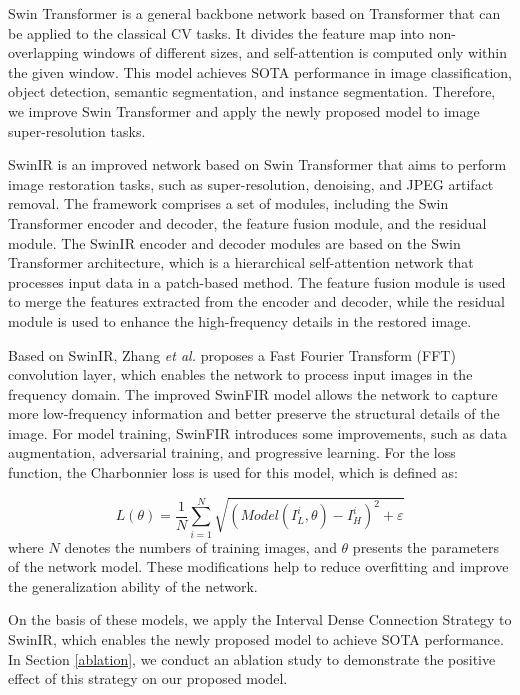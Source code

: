 \documentclass[default,iicol]{sn-jnl}
\theoremstyle{thmstyleone}\newtheorem{theorem}{Theorem}\newtheorem{proposition}[theorem]{Proposition}
\theoremstyle{thmstyletwo}\newtheorem{example}{Example}\newtheorem{remark}{Remark}\theoremstyle{thmstylethree}\newtheorem{definition}{Definition}
\begin{document}
Swin Transformer \cite{liu2021swin} is a general backbone network based on Transformer that can be applied to the classical CV tasks. It divides the feature map into non-overlapping windows of different sizes, and self-attention is computed only within the given window. This model achieves SOTA performance in image classification, object detection, semantic segmentation, and instance segmentation. Therefore, we improve Swin Transformer and apply the newly proposed model to image super-resolution tasks.

SwinIR \cite{liang2021swinir} is an improved network based on Swin Transformer that aims to perform image restoration tasks, such as super-resolution, denoising, and JPEG artifact removal. The framework comprises a set of modules, including the Swin Transformer encoder and decoder, the feature fusion module, and the residual module. The SwinIR encoder and decoder modules are based on the Swin Transformer architecture, which is a hierarchical self-attention network that processes input data in a patch-based method. The feature fusion module is used to merge the features extracted from the encoder and decoder, while the residual module is used to enhance the high-frequency details in the restored image.

Based on SwinIR, Zhang \emph{et al.} \cite{zhang2022swinfir} proposes a Fast Fourier Transform (FFT) convolution layer, which enables the network to process input images in the frequency domain. The improved SwinFIR model allows the network to capture more low-frequency information and better preserve the structural details of the image. For model training, SwinFIR introduces some improvements, such as data augmentation, adversarial training, and progressive learning. For the loss function, the Charbonnier loss \cite{lai2018fast} is used for this model, which is defined as:

\begin{equation}
L(\theta)=\frac{1}{N} \sum_{i=1}^{N} \sqrt{\left(Model\left(I_{L}^{i}, \theta\right)-I_{H}^{i}\right)^{2}+\varepsilon}
\end{equation} 
where $N$ denotes the numbers of training images, and $\theta$ presents the parameters of the network model. These modifications help to reduce overfitting and improve the generalization ability of the network.

On the basis of these models, we apply the Interval Dense Connection Strategy to SwinIR, which enables the newly proposed model to achieve SOTA performance. In Section \ref{ablation}, we conduct an ablation study to demonstrate the positive effect of this strategy on our proposed model.
\end{document}
